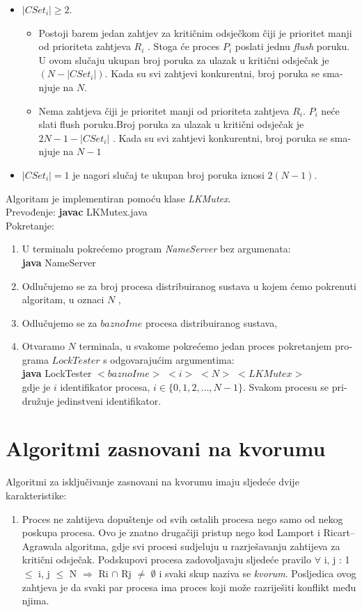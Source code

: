 \documentclass[12pt]{rectors}
\begin{document}
\begin{otherlanguage}{croatian}
\begin{itemize}
	\item $|CSet_i| \geq 2$.
	\begin{itemize}
		\item Postoji barem jedan zahtjev za kritičnim odsječkom
		čiji je prioritet manji od prioriteta zahtjeva $R_i$ . Stoga će proces $P_i$ poslati jednu \textit{flush} poruku. U ovom slučaju ukupan broj poruka za ulazak u kritični odsječak je $(N - |CSet_i|)$. Kada su svi zahtjevi konkurentni, broj poruka se smanjuje na $N$.
		\item Nema zahtjeva čiji je prioritet manji od prioriteta zahtjeva $R_i$. $P_i$ neće slati flush poruku.Broj poruka za ulazak u kritični odsječak je $2N -1-|CSet_i|$ . Kada su svi zahtjevi	konkurentni, broj poruka se smanjuje na $N-1$
	\end{itemize}
	\item $|CSet_i| = 1$ je nagori slučaj te ukupan broj poruka iznosi $2(N-1)$. 
\end{itemize}

Algoritam je implementiran pomoću klase \textit{LKMutex}.\\
Prevođenje: \textbf{javac} LKMutex.java\\
Pokretanje: %
\begin{enumerate}
	\item U terminalu pokrećemo program \textit{NameServer} bez argumenata:\\
	\textbf{java} NameServer
	\item Odlučujemo se za broj procesa distribuiranog sustava u kojem ćemo pokrenuti 
	algoritam, u oznaci $N$ ,
	\item Odlučujemo se za $baznoIme$ procesa distribuiranog sustava,
	\item Otvaramo $N$ terminala, u svakome pokrećemo jedan proces pokretanjem programa
	$LockTester$ s odgovarajućim argumentima:\\
	\textbf{java} LockTester $<baznoIme>$ $<i>$ $<N>$ $<LKMutex>$
	\vspace{0.2cm}
	\\gdje je $i$ identifikator procesa, $i \in \{ 0,1,2,\hdots,N-1 \}$. 
	Svakom procesu se pridružuje jedinstveni identifikator.
\end{enumerate}
\section{Algoritmi zasnovani na kvorumu}
Algoritmi za isključivanje zasnovani na kvorumu imaju sljedeće dvije karakteristike:
\begin{enumerate}
	\item {Proces ne zahtijeva dopuštenje od svih ostalih procesa nego samo od nekog poskupa procesa. Ovo je znatno drugačiji pristup nego kod Lamport i  Ricart–Agrawala algoritma, gdje svi procesi sudjeluju u razrješavanju zahtijeva za kritični odsječak. Podskupovi procesa zadovoljavaju sljedeće pravilo $\forall$ i, j : 1 $\leq$ i, j $\leq$ N $\Rightarrow$ Ri $\cap$ Rj $\neq$  $\emptyset$ i svaki skup naziva se \textit{kvorum}. Posljedica ovog zahtjeva je da svaki par procesa ima proces koji može razriješiti konflikt među njima. }
	

\end{enumerate}
\end{otherlanguage}
\end{document}
